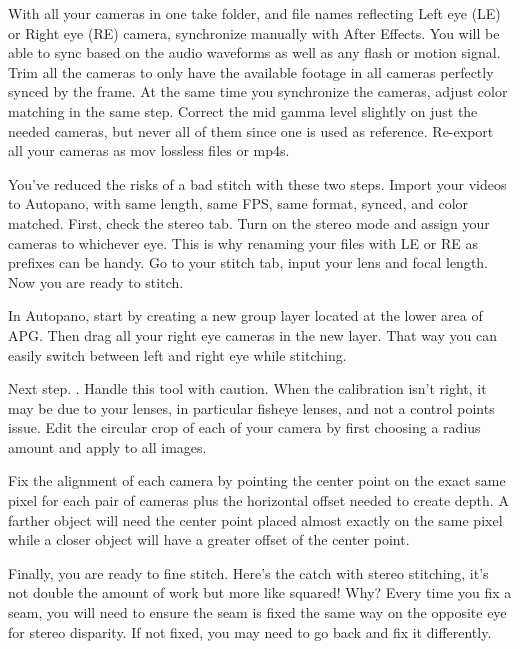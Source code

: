 \begin{fullwidth}
With all your cameras in one take folder, and file names reflecting Left eye (LE) or Right eye (RE) camera, synchronize manually with After Effects. You will be able to sync based on the audio waveforms as well as any flash or motion signal. Trim all the cameras to only have the available footage in all cameras perfectly synced by the frame. At the same time you synchronize the cameras, adjust color matching in the same step. Correct the mid gamma level slightly on just the needed cameras, but never all of them since one is used as reference. Re-export all your cameras as mov lossless files or mp4s.


You’ve reduced the risks of a bad stitch with these two steps. Import your videos to Autopano, with same length, same FPS, same format, synced, and color matched. First, check the stereo tab. Turn on the stereo mode and assign your cameras to whichever eye. This is why renaming your files with LE or RE as prefixes can be handy. Go to your stitch tab, input your lens and focal length. Now you are ready to stitch. 


In Autopano, start by creating a new group layer located at the lower area of APG. Then drag all your right eye cameras in the new layer. That way you can easily switch between left and right eye while stitching.


Next step. \textbf{}. Handle this tool with caution. When the calibration isn't right, it may be due to your lenses, in particular fisheye lenses, and not a control points issue. Edit the circular crop of each of your camera by first choosing a radius amount and apply to all images. 


Fix the alignment of each camera by pointing the center point on the exact same pixel for each pair of cameras plus the horizontal offset needed to create depth. A farther object will need the center point placed almost exactly on the same pixel while a closer object will have a greater offset of the center point. 



Finally, you are ready to fine stitch. Here’s the catch with stereo stitching, it’s not double the amount of work but more like squared! Why? Every time you fix a seam, you will need to ensure the seam is fixed the same way on the opposite eye for stereo disparity. If not fixed, you may need to go back and fix it differently. 


\end{fullwidth}
